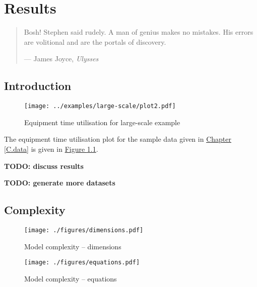 %
%
%
%

\chapter{Results}\label{C.results}

\begin{quote}
Bosh! Stephen said rudely.
A man of genius makes no mistakes.
His errors are volitional and are the portals of discovery.

\hspace{2cm}--- James Joyce, \emph{Ulysses}
\end{quote}

\section{Introduction}\label{S.intro5}
\begin{figure}
    \centering
    \texttt{[image: ../examples/large-scale/plot2.pdf]}
    \caption{Equipment time utilisation for large-scale example}
    \label{fig.etu}
\end{figure}
The equipment time utilisation plot for the sample data given in 
\hyperref[C.data]{Chapter \ref*{C.data}} is given in
\hyperref[fig.etu]{Figure \ref*{fig.etu}}.

\textbf{TODO: discuss results}

\textbf{TODO: generate more datasets}

\section{Complexity}\label{S.complexity}
\begin{figure}
    \centering
    \texttt{[image: ./figures/dimensions.pdf]}
    \caption{Model complexity -- dimensions}
    \label{fig.dims}
\end{figure}
\begin{figure}
    \centering
    \texttt{[image: ./figures/equations.pdf]}
    \caption{Model complexity -- equations}
    \label{fig.eqns}
\end{figure}

